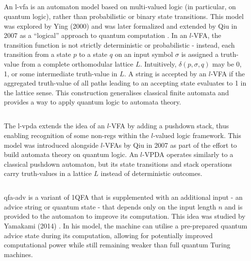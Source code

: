 \subsection{} 
An \gls{l-vfa} is an automaton model based on multi-valued logic (in particular, on quantum logic), rather than probabilistic or binary state transitions. This model was explored by Ying (2000) and was later formalized and extended by Qiu in 2007 as a “logical” approach to quantum computation \cite{qiu2007automata}. In an $l$-VFA, the transition function is not strictly deterministic or probabilistic - instead, each transition from a state $p$ to a state $q$ on an input symbol $\sigma$ is assigned a truth-value from a complete orthomodular lattice $L$. Intuitively, $\delta(p,\sigma,q)$ may be 0, 1, or some intermediate truth-value in $L$. A string is accepted by an $l$-VFA if the aggregated truth-value of all paths leading to an accepting state evaluates to 1 in the lattice sense. This construction generalises classical finite automata and provides a way to apply quantum logic to automata theory.

\subsection{} 
The \gls{l-vpda} extends the idea of an $l$-VFA by adding a pushdown stack, thus enabling recognition of some non-\glspl{reg} within the $l$-valued logic framework. This model was introduced alongside $l$-VFAs by Qiu in 2007 \cite{qiu2007automata} as part of the effort to build automata theory on quantum logic. An $l$-VPDA operates similarly to a classical pushdown automaton, but its state transitions and stack operations carry truth-values in a lattice $L$ instead of deterministic outcomes.

\subsection{} 
\gls{qfa-adv} is a variant of 1QFA that is supplemented with an additional input - an advice string or quantum state - that depends only on the input length $n$ and is provided to the automaton to improve its computation. This idea was studied by Yamakami (2014) \cite{yamakami2014one}. In his model, the machine can utilise a pre-prepared quantum advice state during its computation, allowing for potentially improved computational power while still remaining weaker than full quantum Turing machines.

